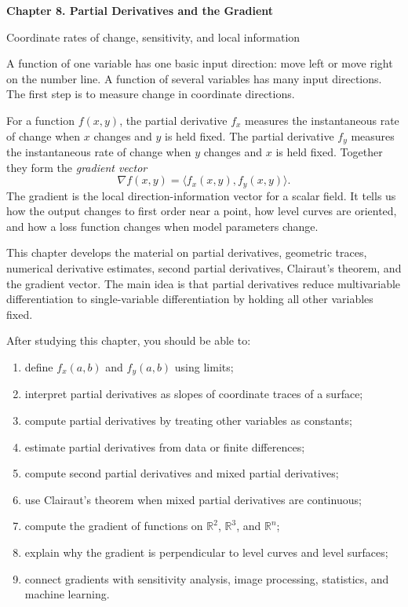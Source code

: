 \documentclass[11pt]{article}
\newcommand{\R}{\mathbb R}
\newcommand{\grad}{\nabla}
\begin{document}
\begin{center}
  {\LARGE\bfseries Chapter 8. Partial Derivatives and the Gradient\par}
  \vspace{0.3em}
  {\large Coordinate rates of change, sensitivity, and local information\par}
\end{center}

\begin{chapteroverviewbox}
A function of one variable has one basic input direction: move left or move right on the number line. A function of several variables has many input directions. The first step is to measure change in coordinate directions.

For a function $f(x,y)$, the partial derivative $f_x$ measures the instantaneous rate of change when $x$ changes and $y$ is held fixed. The partial derivative $f_y$ measures the instantaneous rate of change when $y$ changes and $x$ is held fixed. Together they form the \emph{gradient vector}
\[
\grad f(x,y)=\langle f_x(x,y),f_y(x,y)\rangle.
\]
The gradient is the local direction-information vector for a scalar field. It tells us how the output changes to first order near a point, how level curves are oriented, and how a loss function changes when model parameters change.
\end{chapteroverviewbox}

\begin{notebox}
This chapter develops the material on partial derivatives, geometric traces, numerical derivative estimates, second partial derivatives, Clairaut's theorem, and the gradient vector. The main idea is that partial derivatives reduce multivariable differentiation to single-variable differentiation by holding all other variables fixed.
\end{notebox}

\begin{goalbox}
After studying this chapter, you should be able to:
\begin{enumerate}
  \item define $f_x(a,b)$ and $f_y(a,b)$ using limits;
  \item interpret partial derivatives as slopes of coordinate traces of a surface;
  \item compute partial derivatives by treating other variables as constants;
  \item estimate partial derivatives from data or finite differences;
  \item compute second partial derivatives and mixed partial derivatives;
  \item use Clairaut's theorem when mixed partial derivatives are continuous;
  \item compute the gradient of functions on $\R^2$, $\R^3$, and $\R^n$;
  \item explain why the gradient is perpendicular to level curves and level surfaces;
  \item connect gradients with sensitivity analysis, image processing, statistics, and machine learning.
\end{enumerate}
\end{goalbox}
\end{document}
